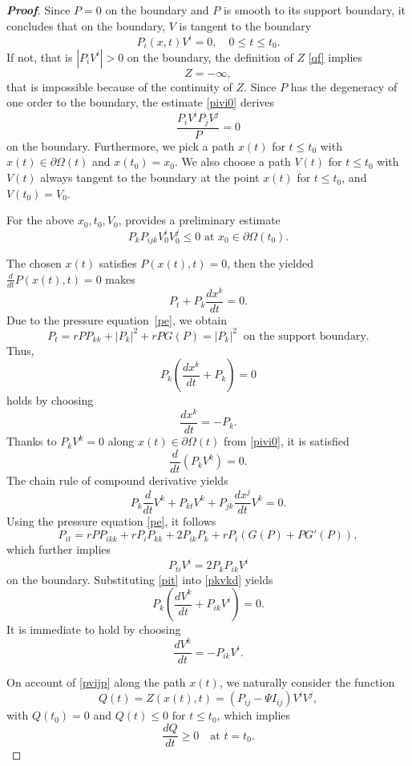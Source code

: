 \documentclass[10pt]{article}         %
\numberwithin{equation}{section}
\begin{document}
\begin{proof}[\bf Proof]
Since $P=0$ on the boundary and $P$ is smooth to its support boundary, it concludes that on the boundary, $V$ is tangent to the boundary
\begin{equation}\label{pivi0}P_i(x,t)V^i=0,\quad 0\leq t\leq t_0.\end{equation}
If not,  that is $|P_iV^i|>0$  on the boundary, the definition of $Z$ \eqref{qf}  implies 
\[Z=-\infty,\]
that is impossible because of the continuity of $Z$. %
Since %
$P$ has the degeneracy of one order to the boundary, the estimate \eqref{pivi0} derives 
\begin{equation}\label{pvijp}
    \frac{P_iV^iP_jV^j}{P}=0
\end{equation}
on the boundary.  Furthermore,  we pick a path $x(t)$ for $t\leq t_0$ with $x(t)\in\partial \Omega(t)$ and $x(t_0)=x_0$. We also choose a path $V(t)$ for $t\leq t_0$ with $V(t)$ always tangent to the boundary at the point $x(t)$  for $t\leq t_0$, and $V(t_0)=V_0$. 

For the above $x_0,t_0,V_0$, \cite[Lemma 2.2]{DHL2001} provides a preliminary estimate 
\begin{equation}\label{np}
P_kP_{ijk}V_0^iV_0^j\leq 0\text{ at }x_0\in\partial\Omega(t_0).
\end{equation}

The chosen $x(t)$ satisfies $P(x(t),t)=0$, then the yielded
$\frac{d}{dt} P(x(t),t)=0$
 makes
\[P_t+P_k\frac{dx^k}{dt}=0.\]
Due to the pressure equation~\eqref{pe}, we obtain
\[P_t=rPP_{kk}+|P_k|^2+rPG(P)=|P_k|^2\ \text{ on the support  boundary.}\] 
 Thus,  \[P_k(\frac{dx^k}{dt}+P_k)=0\] holds by choosing 
\[\frac{dx^k}{dt}=-P_k.\]
Thanks to $P_kV^k=0$ along $x(t)\in\partial \Omega(t)$ from \eqref{pivi0}, it is satisfied 
\[\frac{d}{dt}(P_kV^k)=0.\]
The chain rule of compound derivative yields 
\begin{equation}\label{pkvkd}P_k\frac{d}{dt}V^k+P_{kt}V^k+P_{jk}\frac{dx^j}{dt}V^k=0.\end{equation}
Using the pressure equation \eqref{pe}, it follows 
\[P_{it}=rPP_{ikk}+rP_iP_{kk}+2P_{ik}P_k+rP_i(G(P)+PG'(P)),\]
which further implies 
\begin{equation}\label{pit}P_{ti}V^i=2P_kP_{ik}V^i\end{equation}
 on the boundary. Substituting \eqref{pit} into \eqref{pkvkd} yields 
\[P_k(\frac{dV^k}{dt}+P_{ik}V^i)=0.\]
It is immediate to hold by choosing
\[\frac{dV^k}{dt}=-P_{ik}V^i.\]


On account of \eqref{pvijp} along the path $x(t)$, we naturally consider the function 
\[Q(t)=Z(x(t),t)=(P_{ij}-\Psi I_{ij})V^iV^j,\]
with $Q(t_0)=0$ and $Q(t)\leq 0\text{ for } t\leq t_0$, which implies 
\begin{equation}\label{aqt}
\frac{dQ}{dt}\geq0\quad \text{at }t=t_0.
\end{equation} 




\end{proof}
\end{document}
